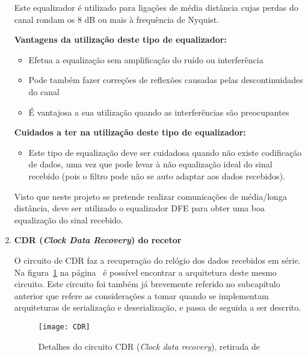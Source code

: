 \begin{enumerate}
	\hspace{1.0em}Este equalizador é utilizado para ligações de média distância cujas perdas do canal rondam os 8 dB ou mais à frequência de Nyquist. 
	
	\hspace{1.0em}\textbf{Vantagens da utilização deste tipo de equalizador:}
	\begin{itemize}
		\item Efetua a equalização sem amplificação do ruído ou interferência
		\item Pode também fazer correções de reflexões causadas pelas descontinuidades do canal 
		\item É vantajosa a sua utilização quando as interferências são preocupantes 
	\end{itemize}
	
	\hspace{1.0em}\textbf{Cuidados a ter na utilização deste tipo de equalizador:}
	\begin{itemize}
		\item Este tipo de equalização deve ser cuidadosa quando não existe codificação de dados, uma vez que pode levar à não equalização ideal do sinal recebido (pois o filtro pode não se auto adaptar aos dados recebidos).
	\end{itemize}

	\hspace{1.0em}Visto que neste projeto se pretende realizar comunicações de média/longa distância, deve ser utilizado o equalizador DFE para obter uma boa equalização do sinal recebido. 
	
	\item \textbf{CDR (\textit{Clock Data Recovery}) do recetor}
	
	\hspace{1.0em}O circuito de CDR faz a recuperação do relógio dos dados recebidos em série. Na figura~\ref{fig:cdr} na página~\pageref{fig:cdr} é possível encontrar a arquitetura deste mesmo circuito. Este circuito foi também já brevemente referido no subcapítulo anterior que refere as considerações a tomar quando se implementam arquiteturas de serialização e deserialização, e passa de seguida a ser descrito.
	
	\begin{figure}[h!]
		\begin{center}
			\leavevmode
			\texttt{[image: CDR]}
			\caption{Detalhes do circuito CDR (\textit{Clock data recovery}), retirada de \cite{R011}}
			\label{fig:cdr}
		\end{center}
	\end{figure}


\end{enumerate}
